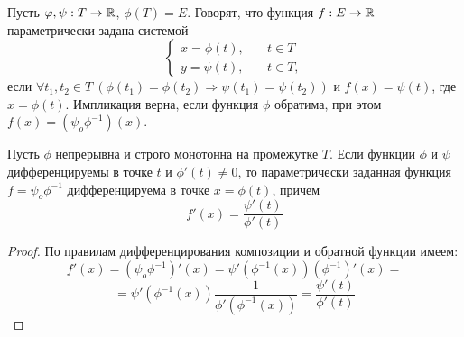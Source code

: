 \begin{definition}
    Пусть $\varphi, \psi: T \to \mathbb{R}$, $\phi(T) = E$. Говорят, что функция $f: E \to \mathbb{R}$ параметрически задана системой
    \[
    \begin{cases}
        x = \phi (t),   & \quad t \in T\\
        y = \psi (t),  & \quad t \in T,
    \end{cases}
    \]
    если $\forall t_{1}, t_{2} \in T \ (\phi(t_{1}) = \phi(t_{2}) \Rightarrow \psi(t_{1}) = \psi(t_{2}))$ и $f(x) = \psi(t)$, где $x = \phi(t)$.
    Импликация верна, если функция $\phi$ обратима, при этом $f(x) = (\psi_{o}\phi^{-1})(x)$.
\end{definition}

\begin{corollary}
    Пусть $\phi$ непрерывна и строго монотонна на промежутке $T$. Если функции $\phi$ и $\psi$ дифференцируемы в точке $t$ и $\phi'(t) \neq 0$, то параметрически заданная функция $f = \psi_{o}\phi ^{-1}$ дифференцируема в точке $x = \phi(t)$, причем 
    \[f'(x) = \frac{\psi'(t)}{\phi'(t)}\]
\end{corollary}

\begin{proof}
    По правилам дифференцирования композиции и обратной функции имеем:
    \[f'(x) = (\psi_{o}\phi^{-1})'(x) = \psi'(\phi^{-1}(x))(\phi^{-1})'(x) =\]
    \[= \psi'(\phi^{-1}(x))\frac{1}{\phi'(\phi^{-1}(x))} = \frac{\psi'(t)}{\phi'(t)}\]
\end{proof}

